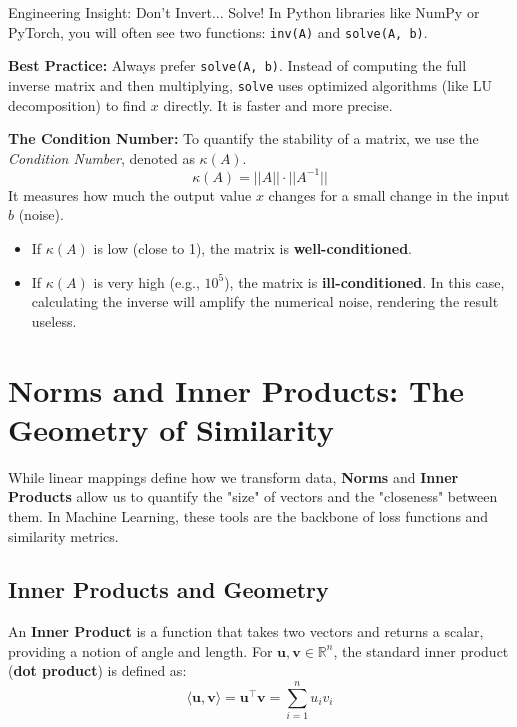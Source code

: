\documentclass[12pt,a4paper,twoside,openright]{book}
\begin{document}
\begin{unibobox}{Engineering Insight: Don't Invert... Solve!}
In Python libraries like NumPy or PyTorch, you will often see two functions: \texttt{inv(A)} and \texttt{solve(A, b)}.

\textbf{Best Practice:} Always prefer \texttt{solve(A, b)}.
Instead of computing the full inverse matrix and then multiplying, \texttt{solve} uses optimized algorithms (like LU decomposition) to find $x$ directly. It is faster and more precise.

\textbf{The Condition Number:}
To quantify the stability of a matrix, we use the \textit{Condition Number}, denoted as $\kappa(A)$.
\[
\kappa(A) = ||A|| \cdot ||A^{-1}||
\]
It measures how much the output value $x$ changes for a small change in the input $b$ (noise).
\begin{itemize}
    \item If $\kappa(A)$ is low (close to 1), the matrix is \textbf{well-conditioned}.
    \item If $\kappa(A)$ is very high (e.g., $10^5$), the matrix is \textbf{ill-conditioned}. In this case, calculating the inverse will amplify the numerical noise, rendering the result useless.
\end{itemize}
\end{unibobox}

\section{Norms and Inner Products: The Geometry of Similarity}

While linear mappings define how we transform data, \textbf{Norms} and \textbf{Inner Products} allow us to quantify the "size" of vectors and the "closeness" between them. In Machine Learning, these tools are the backbone of loss functions and similarity metrics.

\subsection{Inner Products and Geometry}
An \textbf{Inner Product} is a function that takes two vectors and returns a scalar, providing a notion of angle and length. For $\mathbf{u}, \mathbf{v} \in \mathbb{R}^n$, the standard inner product (\textbf{dot product}) is defined as:
\begin{equation}
    \langle \mathbf{u}, \mathbf{v} \rangle = \mathbf{u}^\top \mathbf{v} = \sum_{i=1}^n u_i v_i
\end{equation}
\end{document}
